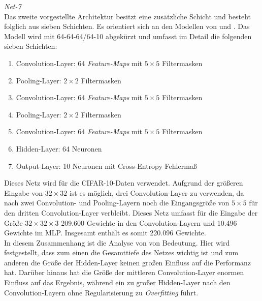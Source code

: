 \textit{Net-7} \\
Das zweite vorgestellte Architektur besitzt eine zusätzliche Schicht und besteht folglich aus sieben Schichten. Es orientiert sich an den Modellen von \cite{Hinton2012} und \cite{Zeiler2013b}.
Das Modell wird mit 64-64-64/64-10 abgekürzt und umfasst im Detail die folgenden sieben Schichten:
\begin{enumerate}
\setlength{\itemsep}{0pt}
\item Convolution-Layer: 64 \textit{Feature-Maps} mit $5 \times 5$ Filtermasken
\item Pooling-Layer:	$2 \times 2$ Filtermasken
\item Convolution-Layer: 64 \textit{Feature-Maps} mit $5 \times 5$ Filtermasken
\item Pooling-Layer:	$2 \times 2$ Filtermasken
\item Convolution-Layer: 64 \textit{Feature-Maps} mit $5 \times 5$ Filtermasken
\item Hidden-Layer: 64 Neuronen
\item Output-Layer: 10 Neuronen mit Cross-Entropy Fehlermaß
\end{enumerate}
Dieses Netz wird für die CIFAR-10-Daten verwendet. Aufgrund der größeren Eingabe von $32 \times 32$ ist es möglich, drei Convolution-Layer zu verwenden, da nach zwei Convolution- und Pooling-Layern noch die Eingangsgröße von $5 \times 5$ für den dritten Convolution-Layer verbleibt. Dieses Netz umfasst für die Eingabe der Größe $32 \times 32 \times 3$ 209.600 Gewichte in den Convolution-Layern und 10.496 Gewichte im MLP.  Insgesamt enthält es somit 220.096 Gewichte. \\

In diesem Zusammenhang ist die Analyse von \cite{Zeiler2014} von Bedeutung. Hier wird festgestellt, dass zum einen die Gesamttiefe des Netzes wichtig ist und zum anderen die Größe der Hidden-Layer keinen großen Einfluss auf die Performanz hat. Darüber hinaus hat die Größe der mittleren Convolution-Layer enormen Einfluss auf das Ergebnis, während ein zu großer Hidden-Layer nach den Convolution-Layern ohne Regularisierung zu \textit{Overfitting} führt.

